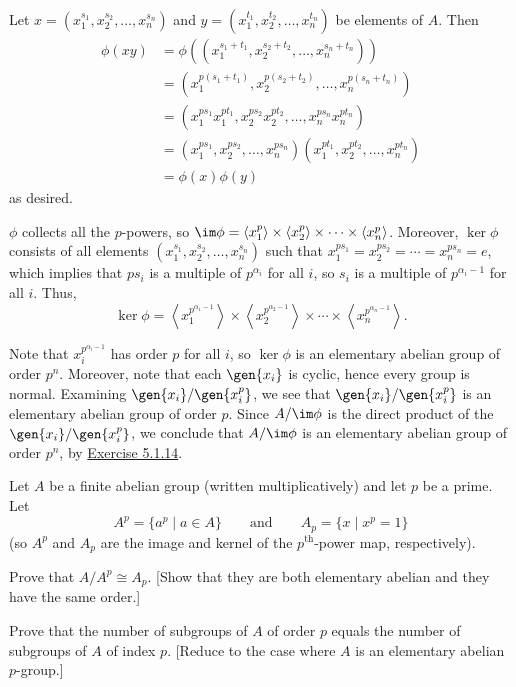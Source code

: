 \begin{solalph}
    \item Let $x = (x_1^{s_1}, x_2^{s_2}, \ldots, x_n^{s_n})$ and $y = (x_1^{t_1}, x_2^{t_2}, \ldots, x_n^{t_n})$ be elements of $A$. Then
    \begin{align*}
        \phi(xy) & = \phi((x_1^{s_1 + t_1}, x_2^{s_2 + t_2}, \ldots, x_n^{s_n + t_n})) \\
        & = (x_1^{p(s_1 + t_1)}, x_2^{p(s_2 + t_2)}, \ldots, x_n^{p(s_n + t_n)}) \\
        & = (x_1^{ps_1} x_1^{pt_1}, x_2^{ps_2} x_2^{pt_2}, \ldots, x_n^{ps_n} x_n^{pt_n}) \\
        & = (x_1^{ps_1}, x_2^{ps_2}, \ldots, x_n^{ps_n})(x_1^{pt_1}, x_2^{pt_2}, \ldots, x_n^{pt_n}) \\
        & = \phi(x)\phi(y)
    \end{align*}
    as desired.
    \item $\phi$ collects all the $p$-powers, so $\im\phi = \langle x_1^p \rangle \times \langle x_2^p \rangle \times \cdots \times \langle x_n^p \rangle$. Moreover, $\ker\phi$ consists of all elements $(x_1^{s_1}, x_2^{s_2}, \ldots, x_n^{s_n})$ such that $x_1^{ps_1} = x_2^{ps_2} = \cdots = x_n^{ps_n} = e$, which implies that $ps_i$ is a multiple of $p^{\alpha_i}$ for all $i$, so $s_i$ is a multiple of $p^{\alpha_i - 1}$ for all $i$. Thus,
    \[\ker\phi = \left\langle x_1^{p^{\alpha_1-1}} \right\rangle \times \left\langle x_2^{p^{\alpha_2-1}} \right\rangle \times \cdots \times \left\langle x_n^{p^{\alpha_n-1}} \right\rangle.\]
    \item Note that $x_i^{p^{\alpha_i - 1}}$ has order $p$ for all $i$, so $\ker\phi$ is an elementary abelian group of order $p^n$. Moreover, note that each $\gen{x_i}$ is cyclic, hence every group is normal. Examining $\gen{x_i} / \gen{x_i^p}$, we see that $\gen{x_i} / \gen{x_i^p}$ is an elementary abelian group of order $p$. Since $A / \im\phi$ is the direct product of the $\gen{x_i} / \gen{x_i^p}$, we conclude that $A / \im\phi$ is an elementary abelian group of order $p^n$, by \hyperref[ex5.1.14]{Exercise 5.1.14}.
\end{solalph}

\begin{exercise}\label{ex5.2.8}
    Let $A$ be a finite abelian group (written multiplicatively) and let $p$ be a prime. Let
    \[A^p = \{a^p \mid a \in A\} \qquad \text{and} \qquad A_p = \{x \mid x^p = 1\}\]
    (so $A^p$ and $A_p$ are the image and kernel of the $p^{\text{th}}$-power map, respectively).
    \begin{subproblems}
        \item Prove that $A/A^p \cong A_p$. [Show that they are both elementary abelian and they have the same order.]
        \item Prove that the number of subgroups of $A$ of order $p$ equals the number of subgroups of $A$ of index $p$. [Reduce to the case where $A$ is an elementary abelian $p$-group.]
    \end{subproblems}
\end{exercise}

